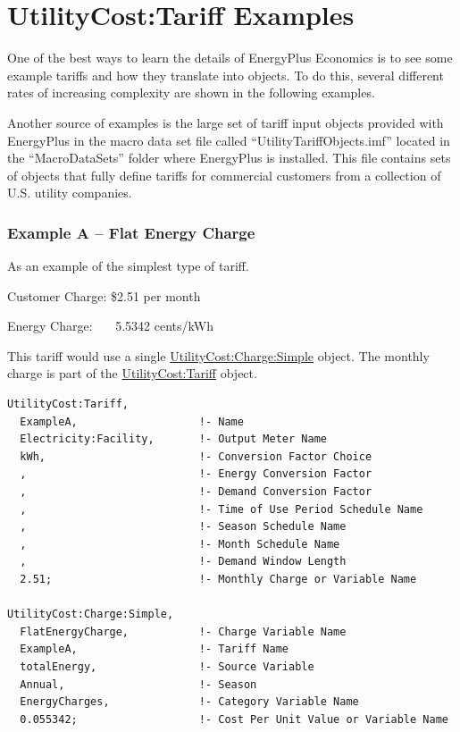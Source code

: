 \section{UtilityCost:Tariff Examples}\label{utilitycosttariff-examples}

One of the best ways to learn the details of EnergyPlus Economics is to see some example tariffs and how they translate into objects. To do this, several different rates of increasing complexity are shown in the following examples.

Another source of examples is the large set of tariff input objects provided with EnergyPlus in the macro data set file called ``UtilityTariffObjects.imf'' located in the ``MacroDataSets'' folder where EnergyPlus is installed. This file contains sets of objects that fully define tariffs for commercial customers from a collection of U.S. utility companies.

\subsubsection{Example A -- Flat Energy Charge}\label{example-a-flat-energy-charge}

As an example of the simplest type of tariff.

Customer Charge: \$2.51 per month

Energy Charge:~~~ 5.5342 cents/kWh

This tariff would use a single \hyperref[utilitycostchargesimple]{UtilityCost:Charge:Simple} object. The monthly charge is part of the \hyperref[utilitycosttariff]{UtilityCost:Tariff} object.

\begin{lstlisting}
UtilityCost:Tariff,
  ExampleA,                   !- Name
  Electricity:Facility,       !- Output Meter Name
  kWh,                        !- Conversion Factor Choice
  ,                           !- Energy Conversion Factor
  ,                           !- Demand Conversion Factor
  ,                           !- Time of Use Period Schedule Name
  ,                           !- Season Schedule Name
  ,                           !- Month Schedule Name
  ,                           !- Demand Window Length
  2.51;                       !- Monthly Charge or Variable Name

UtilityCost:Charge:Simple,
  FlatEnergyCharge,           !- Charge Variable Name
  ExampleA,                   !- Tariff Name
  totalEnergy,                !- Source Variable
  Annual,                     !- Season
  EnergyCharges,              !- Category Variable Name
  0.055342;                   !- Cost Per Unit Value or Variable Name
\end{lstlisting}


